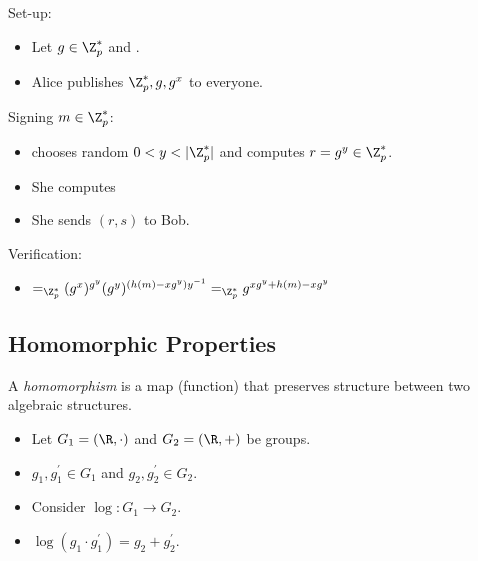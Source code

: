 \begin{frame}
  \begin{definition}
    Set-up:
    \begin{itemize}
      \item Let \(g\in \Z_p^*\) and .
      \item Alice publishes \(\Z_p^*, g, g^x\) to everyone.
    \end{itemize}
    Signing \(m\in \Z_p^*\):
    \begin{itemize}
      \item {} chooses random \(0 < y < |\Z_p^*|\) and computes 
        \(r = g^y\in \Z_p^*\).
      \item She computes 
      \item She sends \((r, s)\) to Bob.
    \end{itemize}
    Verification:
    \begin{itemize}
      \item {}\( =_{\Z_p^*}
          (g^x)^{g^y} (g^y)^{(h(m) - xg^y)y^{-1}} =_{\Z_p^*}
          g^{xg^y + h(m) - xg^y}\)
    \end{itemize}
  \end{definition}
\end{frame}

\subsection{Homomorphic Properties}

\begin{frame}
  \begin{definition}[Homomorphism]
    A \emph{homomorphism} is a map (function) that preserves structure between 
    two algebraic structures.
  \end{definition}

  \pause{}

  \begin{example}
    \begin{itemize}
      \item Let \(G_1 = (\R, \cdot)\) and \(G_2 = (\R, +)\) be groups.
      \item \(g_1, g_1^\prime\in G_1\) and \(g_2, g_2^\prime\in G_2\).

        \pause{}

      \item Consider \(\log\colon G_1\to G_2\).
        
        \pause{}

      \item \(\log(g_1\cdot g_1^\prime) = g_2 + g_2^\prime\).
    \end{itemize}
  \end{example}
\end{frame}

